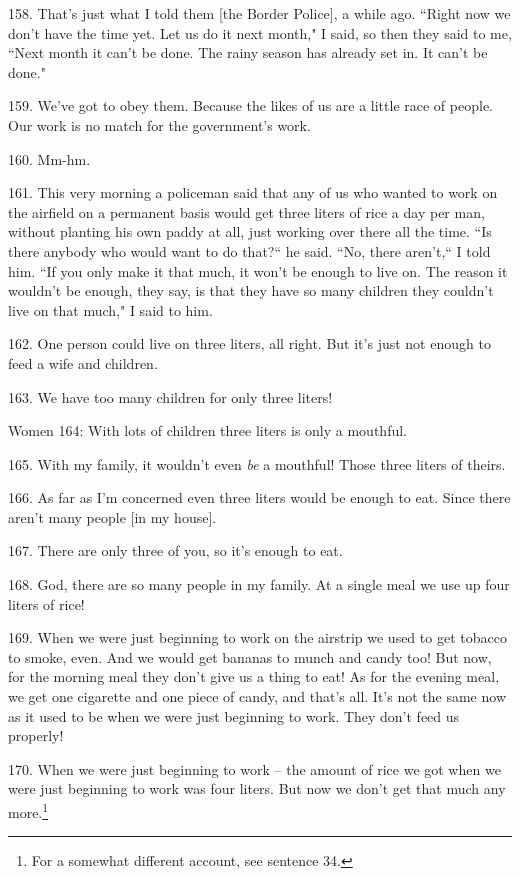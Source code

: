 158. That's just what I told them [the Border Police], a while ago. ``Right
now we don't have the time yet. Let us do it next month," I said, so then
they said to me, ``Next month it can't be done. The rainy season has already set
in. It can't be done."

159. We've got to obey them. Because the likes of us are a little race of people.
Our work is no match for the government's work.

160. Mm-hm.

161. This very morning a policeman said that any of us who wanted to work on the
airfield on a permanent basis would get three liters of rice a day per man, without
planting his own paddy at all, just working over there all the time. ``Is
there anybody who would want to do that?`` he said. ``No, there
aren't,`` I told him. ``If you only make it that much, it won't
be enough to live on. The reason it wouldn't be enough, they say, is that they
have so many children they couldn't live on that much," I said to him.

162. One person could live on three liters, all right. But it's just not enough
to feed a wife and children.

163. We have too many children for only three liters!

Women 164: With lots of children three liters is only a mouthful.

165. With my family, it wouldn't even \textit{be} a mouthful! Those three liters
of theirs.

166. As far as I'm concerned even three liters would be enough to eat. Since there
aren't many people [in my house].

167. There are only three of you, so it's enough to eat.

168. God, there are so many people in my family. At a single meal we use up four
liters of rice!

169. When we were just beginning to work on the airstrip we used to get tobacco
to smoke, even. And we would get bananas to munch and candy too! But now, for the
morning meal they don't give us a thing to eat! As for the evening meal, we get
one cigarette and one piece of candy, and that's all. It's not the same now as
it used to be when we were just beginning to work. They don't feed us properly!

170. When we were just beginning to work -- the amount of rice we got when we were
just beginning to work was four liters. But now we don't get that much any more.\footnote{For a somewhat different account, see sentence 34.}


